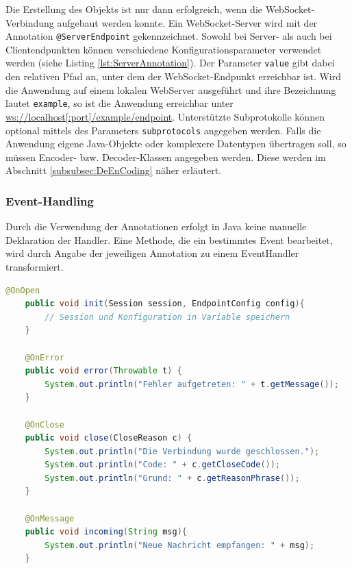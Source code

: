 \documentclass[11pt,a4paper,titlepage]{scrartcl}
\numberwithin{equation}{section}
\begin{document}
\noindent Die Erstellung des Objekts ist nur dann erfolgreich, wenn die WebSocket-Verbindung aufgebaut werden konnte. Ein WebSocket-Server wird mit der Annotation \texttt{@ServerEndpoint} gekennzeichnet. Sowohl bei Server- als auch bei Clientendpunkten können verschiedene Konfigurationsparameter verwendet werden (siehe Listing \ref{lst:ServerAnnotation}). Der Parameter \texttt{value} gibt dabei den relativen Pfad an, unter dem der WebSocket-Endpunkt erreichbar ist. Wird die Anwendung auf einem lokalen WebServer ausgeführt und ihre Bezeichnung lautet \texttt{example}, so ist die Anwendung erreichbar unter \url{ws://localhost[:port]/example/endpoint}. Unterstützte Subprotokolle können optional mittels des Parameters \texttt{subprotocols} angegeben werden. Falls die Anwendung eigene Java-Objekte oder komplexere Datentypen übertragen soll, so müssen Encoder- bzw. Decoder-Klassen angegeben werden. Diese werden im Abschnitt \ref{subsubsec:DeEnCoding} näher erläutert.
%
\subsubsection*{Event-Handling}
\noindent Durch die Verwendung der Annotationen erfolgt in Java keine manuelle Deklaration der Handler. Eine Methode, die ein bestimmtes Event bearbeitet, wird durch Angabe der jeweiligen Annotation zu einem EventHandler transformiert.\\
\begin{lstlisting}[frame=single, language=Java, caption=Java: EventHandler]
	@OnOpen
	public void init(Session session, EndpointConfig config){
		// Session und Konfiguration in Variable speichern
	}
	
	@OnError
	public void error(Throwable t) {
		System.out.println("Fehler aufgetreten: " + t.getMessage());
	}
	
	@OnClose
	public void close(CloseReason c) {
		System.out.println("Die Verbindung wurde geschlossen.");
		System.out.println("Code: " + c.getCloseCode());
		System.out.println("Grund: " + c.getReasonPhrase()); 
	}
	
	@OnMessage
	public void incoming(String msg){
		System.out.println("Neue Nachricht empfangen: " + msg);
	}
	
\end{lstlisting}
\end{document}
